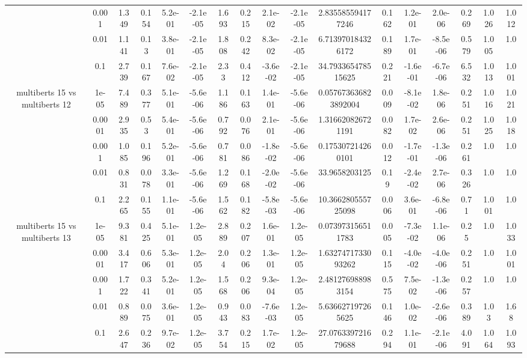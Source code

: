\begin{tabular}{|c|c|c|c|c|c|c|c|c|c|c|c|c|c|c|c|c|}
 & 0.001 & 1.349 & 0.154 & 5.2e-01 & -2.1e-05 & 1.693 & 0.215 & 2.1e-02 & -2.1e-05 & 2.835585594177246 & 0.162 & 1.2e-01 & 2.0e-06 & 0.269 & 1.026 & 1.012 \\
 & 0.01 & 1.141 & 0.13 & 3.8e-01 & -2.1e-05 & 1.808 & 0.242 & 8.3e-02 & -2.1e-05 & 6.713970184326172 & 0.189 & 1.7e-01 & -8.5e-06 & 0.579 & 1.005 & 1.0 \\
 & 0.1 & 2.739 & 0.167 & 7.6e-02 & -2.1e-05 & 2.33 & 0.412 & -3.6e-02 & -2.1e-05 & 34.793365478515625 & 0.221 & -1.6e-01 & -6.7e-06 & 6.532 & 1.013 & 1.001 \\
\hline
\multirow{5}{*}{multiberts 15 vs multiberts 12} & 1e-05 & 7.489 & 0.377 & 5.1e-01 & -5.6e-06 & 1.186 & 0.163 & 1.4e-01 & -5.6e-06 & 0.057673636823892004 & 0.009 & -8.1e-02 & 1.8e-06 & 0.251 & 1.016 & 1.021 \\
 & 0.0001 & 2.935 & 0.53 & 5.4e-01 & -5.6e-06 & 0.792 & 0.076 & 2.1e-01 & -5.6e-06 & 1.316620826721191 & 0.082 & 1.7e-02 & 2.6e-06 & 0.251 & 1.025 & 1.018 \\
 & 0.001 & 1.085 & 0.196 & 5.2e-01 & -5.6e-06 & 0.781 & 0.086 & -1.8e-02 & -5.6e-06 & 0.175307214260101 & 0.012 & -1.7e-01 & -1.3e-06 & 0.261 & 1.0 & 1.0 \\
 & 0.01 & 0.831 & 0.078 & 3.3e-01 & -5.6e-06 & 1.269 & 0.168 & -2.0e-02 & -5.6e-06 & 33.9658203125 & 0.19 & -2.4e-02 & 2.7e-06 & 0.326 & 1.0 & 1.0 \\
 & 0.1 & 2.265 & 0.155 & 1.1e-01 & -5.6e-06 & 1.562 & 0.182 & -5.8e-03 & -5.6e-06 & 10.366280555725098 & 0.006 & 3.6e-01 & -6.8e-06 & 0.71 & 1.001 & 1.0 \\
\hline
\multirow{5}{*}{multiberts 15 vs multiberts 13} & 1e-05 & 9.381 & 0.425 & 5.1e-01 & 1.2e-05 & 2.889 & 0.207 & 1.6e-01 & 1.2e-05 & 0.073973156511783 & 0.005 & -7.3e-02 & 1.1e-06 & 0.25 & 1.0 & 1.033 \\
 & 0.0001 & 3.417 & 0.606 & 5.3e-01 & 1.2e-05 & 2.04 & 0.206 & 1.3e-01 & 1.2e-05 & 1.6327471733093262 & 0.115 & -4.0e-02 & -4.0e-06 & 0.251 & 1.0 & 1.001 \\
 & 0.001 & 1.722 & 0.341 & 5.2e-01 & 1.2e-05 & 1.568 & 0.206 & 9.3e-04 & 1.2e-05 & 2.481276988983154 & 0.575 & 7.5e-02 & -1.3e-06 & 0.257 & 1.0 & 1.0 \\
 & 0.01 & 0.889 & 0.075 & 3.6e-01 & 1.2e-05 & 0.943 & 0.083 & -7.6e-03 & 1.2e-05 & 5.636627197265625 & 0.146 & 1.0e-02 & -2.6e-06 & 0.389 & 1.03 & 1.68 \\
 & 0.1 & 2.647 & 0.236 & 9.7e-02 & 1.2e-05 & 3.754 & 0.215 & 1.7e-02 & 1.2e-05 & 27.076339721679688 & 0.294 & 1.1e-01 & -2.1e-06 & 4.091 & 1.064 & 1.093 \\

\end{tabular}
